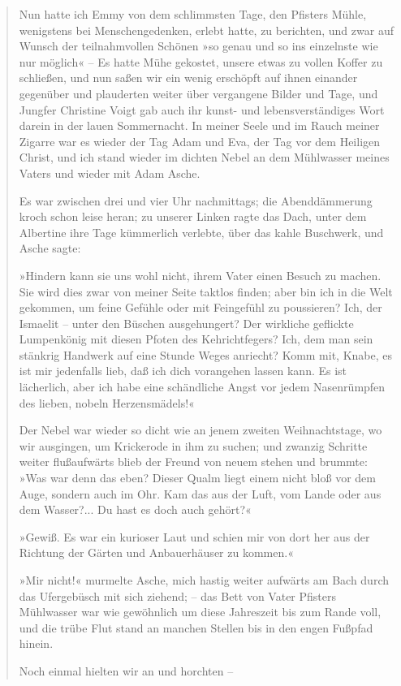 \begin{verse}
Nun hatte ich Emmy von dem schlimmsten Tage, den Pfisters Mühle,
wenigstens bei Menschengedenken, erlebt hatte, zu berichten, und
zwar auf Wunsch der teilnahmvollen Schönen »so genau und so ins
einzelnste wie nur möglich« – Es hatte Mühe gekostet, unsere etwas
zu vollen Koffer zu schließen, und nun saßen wir ein wenig
erschöpft auf ihnen einander gegenüber und plauderten weiter über
vergangene Bilder und Tage, und Jungfer Christine Voigt gab auch
ihr kunst- und lebensverständiges Wort darein in der lauen
Sommernacht. In meiner Seele und im Rauch meiner Zigarre war es
wieder der Tag Adam und Eva, der Tag vor dem Heiligen Christ, und
ich stand wieder im dichten Nebel an dem Mühlwasser meines Vaters
und wieder mit Adam Asche.

Es war zwischen drei und vier Uhr nachmittags; die Abenddämmerung
kroch schon leise heran; zu unserer Linken ragte das Dach, unter
dem Albertine ihre Tage kümmerlich verlebte, über das kahle
Buschwerk, und Asche sagte:

»Hindern kann sie uns wohl nicht, ihrem Vater einen Besuch zu
machen. Sie wird dies zwar von meiner Seite taktlos finden; aber
bin ich in die Welt gekommen, um feine Gefühle oder mit Feingefühl
zu poussieren? Ich, der Ismaelit – unter den Büschen ausgehungert?
Der wirkliche geflickte Lumpenkönig mit diesen Pfoten des
Kehrichtfegers? Ich, dem man sein stänkrig Handwerk auf eine Stunde
Weges anriecht? Komm mit, Knabe, es ist mir jedenfalls lieb, daß
ich dich vorangehen lassen kann. Es ist lächerlich, aber ich habe
eine schändliche Angst vor jedem Nasenrümpfen des lieben, nobeln
Herzensmädels!«

Der Nebel war wieder so dicht wie an jenem zweiten Weihnachtstage,
wo wir ausgingen, um Krickerode in ihm zu suchen; und zwanzig
Schritte weiter flußaufwärts blieb der Freund von neuem stehen und
brummte: »Was war denn das eben? Dieser Qualm liegt einem nicht
bloß vor dem Auge, sondern auch im Ohr. Kam das aus der Luft, vom
Lande oder aus dem Wasser?... Du hast es doch auch gehört?«

»Gewiß. Es war ein kurioser Laut und schien mir von dort her aus
der Richtung der Gärten und Anbauerhäuser zu kommen.«

»Mir nicht!« murmelte Asche, mich hastig weiter aufwärts am Bach
durch das Ufergebüsch mit sich ziehend; – das Bett von Vater
Pfisters Mühlwasser war wie gewöhnlich um diese Jahreszeit bis zum
Rande voll, und die trübe Flut stand an manchen Stellen bis in den
engen Fußpfad hinein.

Noch einmal hielten wir an und horchten –


\end{verse}
